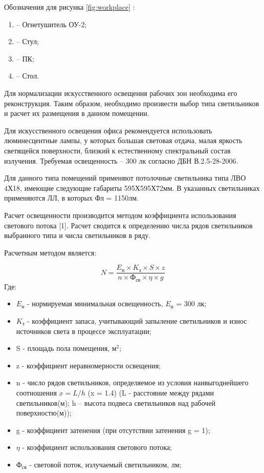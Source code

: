 Обозначения для рисунка \ref{fig:workplace} :

\begin{enumerate}
    \item -- Огнетушитель ОУ-2;
    \item -- Стул;
    \item -- ПК;
    \item -- Стол.
\end{enumerate}

Для нормализации искусственного освещения рабочих зон необходима его реконструкция. Таким образом,
необходимо произвести выбор типа светильников и расчет их размещения в данном помещении.

Для искусственного освещения офиса рекомендуется использовать люминесцентные лампы, у которых большая световая отдача,
малая яркость светящейся поверхности, близкий к естественному спектральный состав излучения. Требуемая освещенность --
300 лк согласно ДБН В.2.5-28-2006.

Для данного типа помещений применяют потолочные светильника типа ЛВО 4Х18, имеющие следующие габариты 595Х595Х72мм.
В указанных светильниках применяются ЛЛ, в которых Фл = 1150лм.

Расчет освещенности производится методом коэффициента использования светового потока [1].
Расчет сводится к определению числа рядов светильников выбранного типа и числа светильников в ряду.

Расчетным методом является:

\begin{equation}\label{eq:main}
    N = \dfrac{E_{\text{н}} \times K_{\text{з}} \times S \times z}{n \times \text{Ф}_{\text{св}} \times \eta \times g}
\end{equation}
Где: 
\begin{itemize}
    \item $E_{\text{н}}$ - нормируемая минимальная освещенность, $E_{\text{н}}$ = 300 лк;
    \item $K_{\text{з}}$ - коэффициент запаса, учитывающий запыление светильников и износ источников света в процессе эксплуатации;
    \item S - площадь пола помещения, ${\text{м}}^2$; 
    \item z - коэффициент неравномерности освещения;
    \item n - число рядов светильников, определяемое из условия наивыгоднейшего соотношения $x = L \slash h$ (x = 1.4)
         (L - расстояние между рядами светильников(м); h -- высота подвеса светильников над рабочей поверхностю(м));
    \item g - коэффициент затенения (при отсутствии затенения g = 1); 
    \item $\eta$ - коэффициент использования светового потока; 
    \item ${\text{Ф}}_{\text{св}}$ - световой поток, излучаемый светильником, лм; 
\end{itemize}

